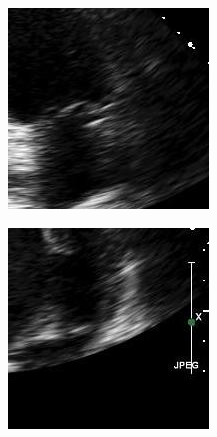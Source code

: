\documentclass[14pt,mathserif]{beamer}
\begin{document}
{\begin{itemize}
\begin{itemize}
{\begin{figure}
\begin{subfigure}{0.28\textwidth}
             \includegraphics[width=\textwidth]{examples/0599_2ch_r.jpg}
           \end{subfigure}
           \begin{subfigure}{0.28\textwidth}
             \includegraphics[width=\textwidth]{examples/0627_2ch_r.jpg}

\end{subfigure}
\end{figure}}
\end{itemize}
\end{itemize}}
\end{document}
